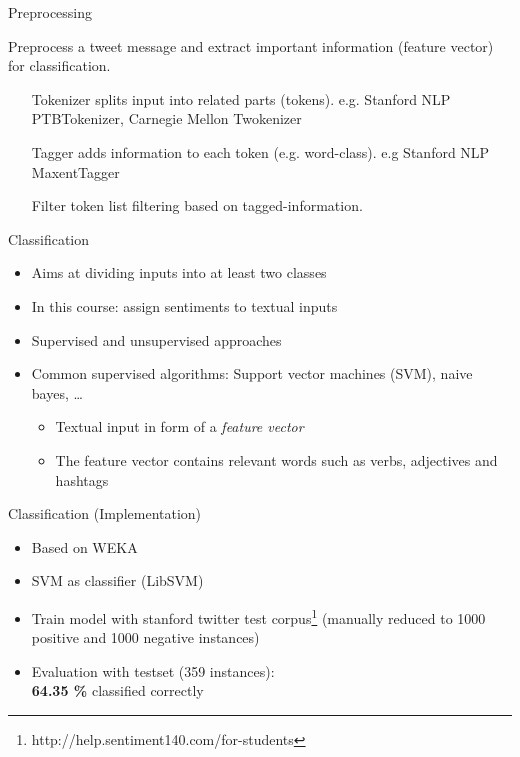 \documentclass{beamer}
\begin{document}
\begin{frame}{Preprocessing}
\begin{block}{}
Preprocess a tweet message and extract important information (feature vector) for classification.
\end{block}
\begin{itemize}
	\item[Tokenizer]
    splits input into related parts (tokens). e.g. Stanford NLP PTBTokenizer, Carnegie Mellon Twokenizer
	\item[Tagger]
    adds information to each token (e.g. word-class).  e.g Stanford NLP MaxentTagger
	\item[Filter token list] 
    filtering based on tagged-information. 
\end{itemize}


\end{frame}

\begin{frame}{Classification}
\begin{itemize}
	\item Aims at dividing inputs into at least two classes
    \item In this course: assign sentiments to textual inputs
    \item Supervised and unsupervised approaches
    \item Common supervised algorithms: Support vector machines (SVM), naive bayes, \ldots
    \begin{itemize}
        \item Textual input in form of a \emph{feature vector}
        \item The feature vector contains relevant words such as verbs, adjectives and hashtags
    \end{itemize}
\end{itemize}
\end{frame}


\begin{frame}{Classification (Implementation)}
\begin{itemize}
	\item Based on WEKA
    \item SVM as classifier (LibSVM)
    \item Train model with stanford twitter test corpus\footnote{\tiny{http://help.sentiment140.com/for-students}} (manually reduced to 1000 positive and 1000 negative instances)
	\item Evaluation with testset (359 instances):\\ \textbf{64.35 \%} classified correctly
\end{itemize}
\end{frame}
\end{document}
